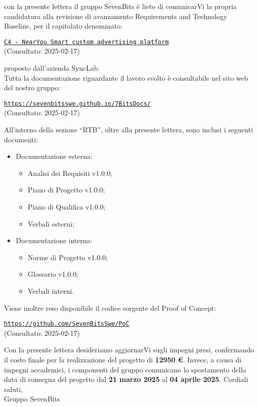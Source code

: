 \documentclass[10pt]{article}
\begin{document}
con la presente lettera il gruppo SevenBits è lieto di comunicarVi la propria candidatura alla revisione di avanzamento Requirements and Technology Baseline, per il capitolato denominato:
\begin{center}
\textcolor{blue}{\texttt{\href{https://www.math.unipd.it/~tullio/IS-1/2024/Progetto/C4.pdf}{C4 - NearYou Smart custom advertising platform}}}\\ (Consultato: 2025-02-17)
\end{center}
proposto dall'azienda SyncLab.\\
Tutta la documentazione riguardante il lavoro svolto è consultabile nel sito web del nostro gruppo:
\begin{center}
\textcolor{blue}{\texttt{\url{https://sevenbitsswe.github.io/7BitsDocs/}}}\\ (Consultato: 2025-02-17)
\end{center}
All'interno della sezione ``RTB'', oltre alla presente lettera, sono inclusi i seguenti documenti:
\begin{itemize}
\item Documentazione esterna:
  \begin{itemize}
    \item Analisi dei Requisiti v1.0.0;
    \item Piano di Progetto v1.0.0;
    \item Piano di Qualifica v1.0.0;
    \item Verbali esterni;
  \end{itemize}
\item Documentazione interna:
  \begin{itemize}
    \item Norme di Progetto v1.0.0;
    \item Glossario v1.0.0;
    \item Verbali interni.
  \end{itemize}
\end{itemize}

Viene inoltre reso disponibile il codice sorgente del Proof of Concept:
\begin{center}
\textcolor{blue}{\texttt{\url{https://github.com/SevenBitsSwe/PoC}}}\\ (Consultato: 2025-02-17)
\end{center}
Con la presente lettera desideriamo aggiornarVi sugli impegni presi, confermando il costo finale per la realizzazione del progetto di \textbf{12950 €}. Invece, a causa di impegni accademici, i componenti del gruppo comunicano lo spostamento della data di consegna del progetto dal \textbf{21 marzo 2025} al \textbf{04 aprile 2025}.
\vspace{2mm}
\newline
Cordiali saluti,\\
Gruppo SevenBits
\end{document}
